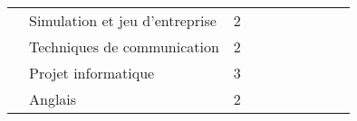 \begin{tabular}{c|m{6cm}|cm{1cm}|cm{1cm}|cm{1cm}|cm{1cm}|}
 \\ \cline{2-6}
 & \cellcolor{couleurClaire} \color{couleurTexte} \mbox{Simulation} \mbox{et} \mbox{jeu} \mbox{d’entreprise}  & \cellcolor{couleurClaire} \color{couleurTexte} 2 & \cellcolor{couleurClaire} \color{couleurTexte}  & \cellcolor{couleurClaire} \color{couleurTexte}  & \cellcolor{couleurClaire} \color{couleurTexte} 
 \\ \cline{2-6}
 & \color{black} \mbox{Techniques} \mbox{de} \mbox{communication}  & \color{black} 2 & \color{black}  & \color{black}  & \color{black} 
 \\ \cline{2-6}
 & \cellcolor{couleurClaire} \color{couleurTexte} \mbox{Projet} \mbox{informatique}  & \cellcolor{couleurClaire} \color{couleurTexte} 3 & \cellcolor{couleurClaire} \color{couleurTexte}  & \cellcolor{couleurClaire} \color{couleurTexte}  & \cellcolor{couleurClaire} \color{couleurTexte} 
 \\ \cline{2-6}
 & \color{black} \mbox{Anglais}  & \color{black} 2 & \color{black}  & \color{black}  & \color{black}  \\ \cline{2-6}
\hline
\end{tabular}
